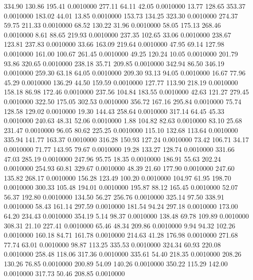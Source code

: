  334.90  130.86  195.41   0.0010000
 277.11   64.11   42.05   0.0010000
  13.77  128.65  353.37   0.0010000
 183.02   44.01   13.85   0.0010000
 153.73  134.25  323.30   0.0010000
 274.37   59.75  211.33   0.0010000
  68.52  130.22   31.96   0.0010000
  58.05  175.13  268.46   0.0010000
   8.61   88.65  219.93   0.0010000
 237.35  102.65   33.06   0.0010000
 238.67  123.81  237.83   0.0010000
  33.66  163.09  219.64   0.0010000
  47.95   69.14  127.98   0.0010000
 161.00  100.67  261.45   0.0010000
  49.25  120.24   10.05   0.0010000
 201.79   93.86  320.65   0.0010000
 238.18   35.71  209.85   0.0010000
 342.94   86.50  346.19   0.0010000
 259.30   63.18   64.05   0.0010000
 209.30   93.13   94.05   0.0010000
  16.67   77.96   45.29   0.0010000
 136.29   44.50  159.59   0.0010000
 127.77  113.90  218.19   0.0010000
 158.18   86.98  172.46   0.0010000
 237.56  104.84  183.55   0.0010000
  42.63  121.27  279.45   0.0010000
 322.50  175.05  302.53   0.0010000
 356.72  167.16  295.84   0.0010000
  75.74  128.58  129.02   0.0010000
  19.30  144.43  258.64   0.0010000
 317.14   64.45   45.33   0.0010000
 240.63   48.31   52.06   0.0010000
   1.88  104.82   82.63   0.0010000
  83.10   25.68  231.47   0.0010000
  96.05   80.62  225.25   0.0010000
 115.10  132.68  113.64   0.0010000
 335.94  141.77  163.37   0.0010000
 316.28  150.93  127.24   0.0010000
  73.42  106.71   34.17   0.0010000
  71.77  143.95   79.67   0.0010000
  19.28  133.27  128.74   0.0010000
 331.66   47.03  285.19   0.0010000
 247.96   95.75   18.35   0.0010000
 186.91   55.63  202.24   0.0010000
 254.93   60.81  329.67   0.0010000
  48.39   21.60  177.90   0.0010000
 247.60  135.82  268.17   0.0010000
 156.28  123.49  100.20   0.0010000
 104.97   61.95  198.70   0.0010000
 300.33  105.48  194.01   0.0010000
 195.87   88.12  165.45   0.0010000
  52.07   56.37  192.80   0.0010000
 134.50   56.27  256.76   0.0010000
 325.14   97.50  338.91   0.0010000
  58.43  161.14  297.59   0.0010000
 181.54   94.24  297.18   0.0010000
 173.00   64.20  234.43   0.0010000
 354.19    5.14   98.37   0.0010000
 138.48   69.78  109.89   0.0010000
 308.31   21.10  227.41   0.0010000
  65.46   48.34  209.86   0.0010000
   9.94   94.32  102.26   0.0010000
 160.18   84.71  161.78   0.0010000
 214.63   41.28  176.98   0.0010000
 271.68   77.74   63.01   0.0010000
  98.87  113.25  335.53   0.0010000
 324.34   60.93  220.08   0.0010000
 258.48  118.06  317.36   0.0010000
 335.61   54.40  218.35   0.0010000
 208.26  130.26   76.85   0.0010000
 200.89   54.09  140.26   0.0010000
 350.22  115.29  142.00   0.0010000
 317.73   50.46  208.85   0.0010000
